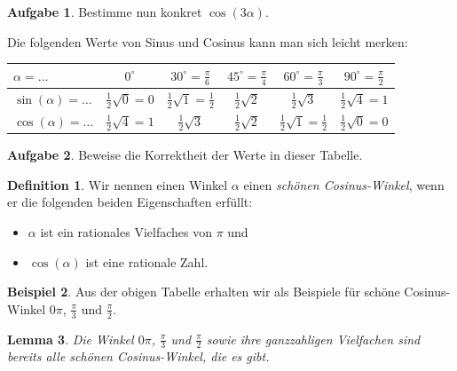\documentclass[a4paper,ngerman,12pt]{scrartcl}
\theoremstyle{definition}
\newtheorem{defn}{Definition}[]
\newtheorem{bsp}[defn]{Beispiel}
\newtheorem{aufg}{Aufgabe}
\theoremstyle{plain}
\newtheorem{lemma}[defn]{Lemma}
\theoremstyle{remark}
\begin{document}
\begin{aufg}
	Bestimme nun konkret $\cos(3\alpha)$. 
\end{aufg}

Die folgenden Werte von Sinus und Cosinus kann man sich leicht merken:
\begin{center}\renewcommand{\arraystretch}{1.5}
	\begin{tabular}{l|c|c|c|c|c}
		$\alpha=\dots$ & $0^\circ$ & $30^\circ = \tfrac{\pi}{6}$  & $45^\circ = \tfrac{\pi}{4}$ & $60^\circ = \tfrac{\pi}{3}$ & $90^\circ = \tfrac{\pi}{2}$ \\\hline\hline
		$\sin(\alpha)=\dots$ & $\tfrac{1}{2}\sqrt{0}=0$ & $\tfrac{1}{2}\sqrt{1}=\tfrac{1}{2}$ & $\tfrac{1}{2}\sqrt{2}$ & $\tfrac{1}{2}\sqrt{3}$ & $\tfrac{1}{2}\sqrt{4}=1$ \\\hline
		$\cos(\alpha)=\dots$ & $\tfrac{1}{2}\sqrt{4}=1$ & $\tfrac{1}{2}\sqrt{3}$ & $\tfrac{1}{2}\sqrt{2}$ & $\tfrac{1}{2}\sqrt{1}=\tfrac{1}{2}$ & $\tfrac{1}{2}\sqrt{0}=0$ 
	\end{tabular}
\end{center}

\begin{aufg}
	Beweise die Korrektheit der Werte in dieser Tabelle.
\end{aufg}

\begin{defn}
	Wir nennen einen Winkel $\alpha$ einen \emph{schönen Cosinus-Winkel}, wenn er die folgenden beiden Eigenschaften erfüllt:
	\begin{itemize}
		\item $\alpha$ ist ein rationales Vielfaches von $\pi$ und
		\item $\cos(\alpha)$ ist eine rationale Zahl.
	\end{itemize}
\end{defn}

\begin{bsp}
	Aus der obigen Tabelle erhalten wir als Beispiele für schöne Cosinus-Winkel $0\pi$, $\tfrac{\pi}{3}$ und $\tfrac{\pi}{2}$.
\end{bsp}

\begin{lemma}\label{lemma:AlleSchoenenCosinusWinkel}
	Die Winkel $0\pi$, $\tfrac{\pi}{3}$ und $\tfrac{\pi}{2}$ sowie ihre ganzzahligen Vielfachen sind bereits alle schönen Cosinus-Winkel, die es gibt.
\end{lemma}
\end{document}
